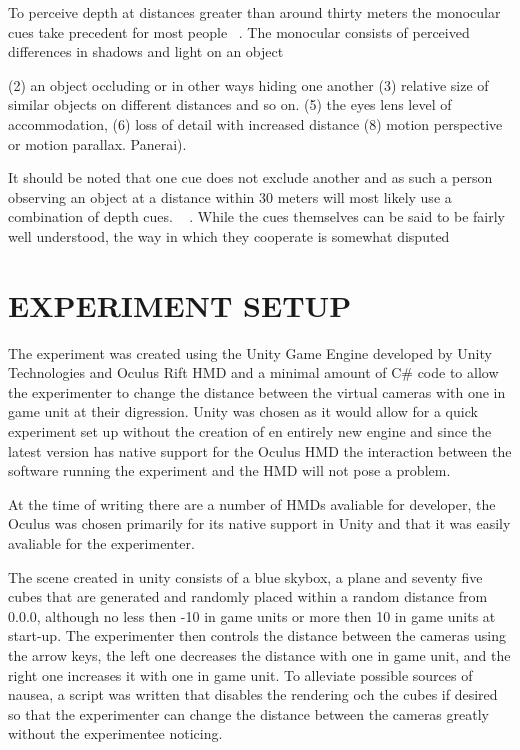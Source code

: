 \documentclass[tog]{acmsiggraph}
\begin{document}
To perceive depth at distances greater than around thirty meters the monocular cues take precedent for most people ~\cite {Palvqvist:2013:DPDS}. The monocular consists of perceived differences in shadows and light on an object 


(2) an object occluding or in other ways hiding one another (3) relative size of similar objects on different distances and so on. (5) the eyes lens level of accommodation, (6) loss of detail with increased distance (8) motion perspective or motion parallax.
Panerai).

It should be noted that one cue does not exclude another and as such a person observing an object at a distance within 30 meters will most likely use a combination of depth cues. ~\cite {Boyd:2000:DPC} . While the cues themselves can be said to be fairly well understood, the way in which they cooperate is somewhat disputed ~\cite {Boyd:2000:DPC} 



\section{EXPERIMENT SETUP}

The experiment was created using the Unity Game Engine developed by Unity Technologies and Oculus Rift HMD and a minimal amount of C\# code to allow the experimenter to change the distance between the virtual cameras with one in game unit at their digression. Unity was chosen as it would allow for a quick experiment set up without the creation of en entirely new engine and since the latest version has native support for the Oculus HMD the interaction between the software running the experiment and the HMD will not pose a problem.

At the time of writing there are a number of HMDs avaliable for developer, the Oculus was chosen primarily for its native support in Unity and that it was easily avaliable for the experimenter.

The scene created in unity consists of a blue skybox, a plane and seventy five cubes that are generated and randomly placed within a random distance from 0.0.0, although no less then -10 in game units or  more then 10 in game units at start-up. The experimenter then controls the distance between the cameras using the arrow keys, the left one decreases the distance with one in game unit, and the right one increases it with one in game unit. To alleviate possible sources of nausea, a script was written that disables the rendering och the cubes if desired so that the experimenter can change the distance between the cameras greatly without the experimentee noticing. 
\end{document}
